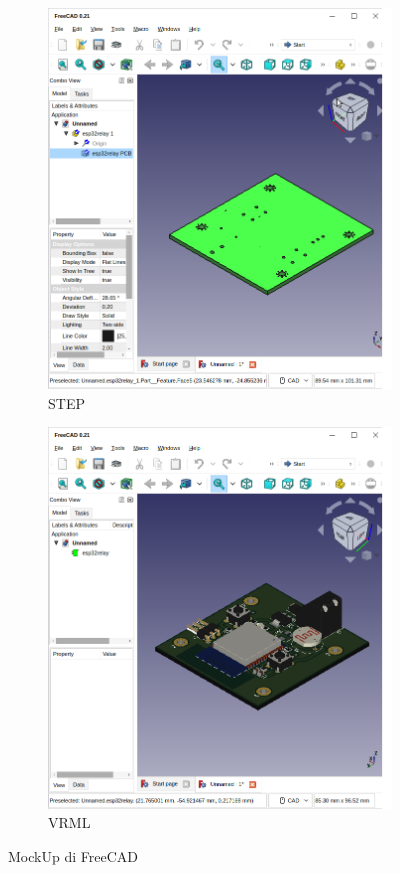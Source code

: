\documentclass[12pt]{book}
\begin{document}
	\newpage
	\begin{figure}[!ht]
		\centering
		\begin{subfigure}[t]{0.45\textwidth}
			\includegraphics[width=\textwidth]{images/fab/fab_12}
			\caption{STEP}
		\end{subfigure}
		\begin{subfigure}[t]{0.45\textwidth}
			\includegraphics[width=\textwidth]{images/fab/fab_14}
			\caption{VRML}
		\end{subfigure}
		\caption{MockUp di FreeCAD}
	\end{figure}
\end{document}
